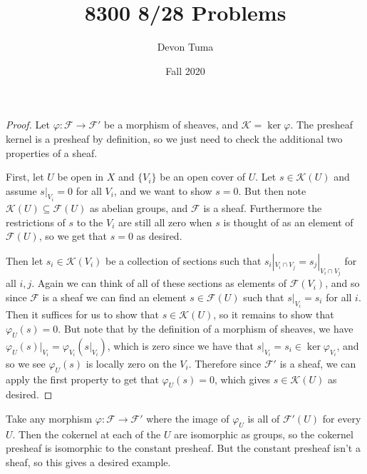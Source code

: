 \documentclass[11pt]{article}
\title{8300 8/28 Problems}
\author{Devon Tuma}
\date{Fall 2020}
\newcommand{\sheaf}{\mathcal{F}}
\begin{document}
\maketitle

\begin{proof}
  Let $\varphi: \sheaf \rightarrow \sheaf'$ be a morphism of sheaves, and $\mathcal{K} = \ker \varphi$.
  The presheaf kernel is a presheaf by definition, so we just need to check the additional two properties of a sheaf.

  First, let $U$ be open in $X$ and $\{V_i\}$ be an open cover of $U$.
  Let $s \in \mathcal{K}(U)$ and assume $s|_{V_i} = 0$ for all $V_i$, and we want to show $s = 0$.
  But then note $\mathcal{K}(U) \subseteq \sheaf(U)$ as abelian groups, and $\sheaf$ is a sheaf.
  Furthermore the restrictions of $s$ to the $V_i$ are still all zero when $s$ is thought of as an element of $\sheaf(U)$, so we get that $s = 0$ as desired.

  Then let $s_i \in \mathcal{K}(V_i)$ be a collection of sections such that $s_i|_{V_i \cap V_j} = s_j|_{V_i \cap V_j}$ for all $i,j$.
  Again we can think of all of these sections as elements of $\sheaf(V_i)$, and so since $\sheaf$ is a sheaf we can find an element $s \in \sheaf(U)$ such that $s|_{V_i} = s_i$ for all $i$.
  Then it suffices for us to show that $s \in \mathcal{K}(U)$, so it remains to show that $\varphi_U(s) = 0$.
  But note that by the definition of a morphism of sheaves, we have $\varphi_U(s)|_{V_i} = \varphi_{V_i}(s|_{V_i})$, which is zero since we have that $s|_{V_i} = s_i \in \ker \varphi_{V_i}$, and so we see $\varphi_U(s)$ is locally zero on the $V_i$.
  Therefore since $\sheaf'$ is a sheaf, we can apply the first property to get that $\varphi_U(s) = 0$, which gives $s \in \mathcal{K}(U)$ as desired.
\end{proof}



Take any morphism $\varphi: \sheaf \rightarrow \sheaf'$ where the image of $\varphi_U$ is all of $\sheaf'(U)$ for every $U$.
Then the cokernel at each of the $U$ are isomorphic as groups, so the cokernel presheaf is isomorphic to the constant presheaf.
But the constant presheaf isn't a sheaf, so this gives a desired example.
\end{document}
